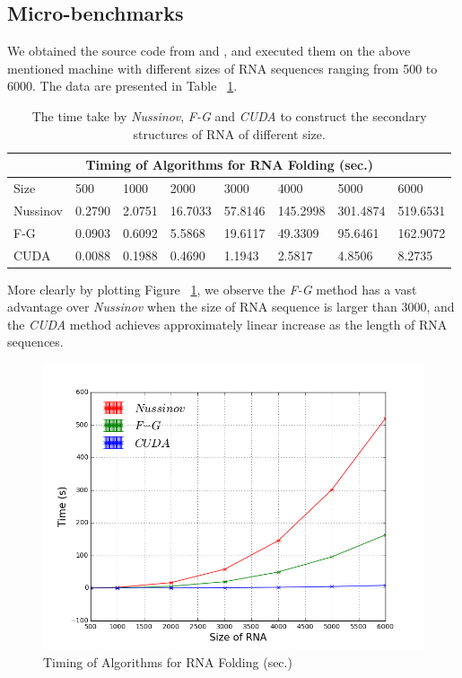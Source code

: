 \documentclass[12pt]{article}
\begin{document}
\subsection{Micro-benchmarks}
\par We obtained the source code from \cite{gusfield} and \cite{balaji}, and executed them on the above mentioned machine with different sizes of RNA sequences ranging from 500 to 6000. The data are presented in Table ~\ref{table:timingAlgorithm}.
\begin{table}
\begin{center}
    \begin{tabular}{ |p{1.5cm}||p{1.2cm}|p{1.3cm}|p{1.3cm}|p{1.4cm}|p{1.4cm}|p{1.4cm}|p{1.6cm}|}
     \hline
     \multicolumn{8}{|c|}{Timing of Algorithms for RNA Folding (sec.)} \\
     \hline
     Size& 500& 1000& 2000& 3000& 4000& 5000& 6000\\
     \hline
     Nussinov& 0.2790& 2.0751& 16.7033& 57.8146& 145.2998& 301.4874& 519.6531\\
     F-G& 0.0903& 0.6092& 5.5868& 19.6117& 49.3309& 95.6461& 162.9072\\
     CUDA& 0.0088& 0.1988& 0.4690& 1.1943& 2.5817& 4.8506& 8.2735\\
     \hline
    \end{tabular}
\end{center}
\caption{The time take by \textit{Nussinov}, \textit{F-G} and \textit{CUDA} to construct the secondary structures of RNA of different size.}
\label{table:timingAlgorithm}
\end{table}
\par More clearly by plotting Figure ~\ref{fig:timingAlgorithm}, we observe the \textit{F-G} method has a vast advantage over \textit{Nussinov} when the size of RNA sequence is larger than 3000, and the \textit{CUDA} method achieves approximately linear increase as the length of RNA sequences.
\begin{figure}[ht!]
  \centering
  \includegraphics[keepaspectratio, scale=.6]{algorithmGraph.png}
  \caption{Timing of Algorithms for RNA Folding (sec.)}
  \label{fig:timingAlgorithm}
\end{figure}
\end{document}
